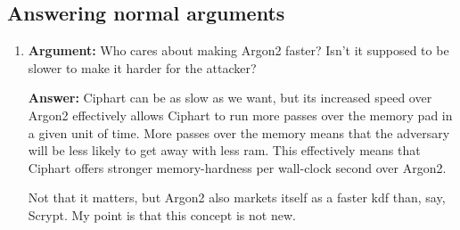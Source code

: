 \documentclass[twocolumn]{article}
\begin{document}
\subsection*{Answering normal arguments}
\begin{enumerate}
    \item \textbf{Argument:} Who cares about making Argon2 faster?  Isn't
    it supposed to be slower to make it harder for the attacker?

    \textbf{Answer:} Ciphart can be as slow as we want, but its increased
    speed over Argon2 effectively allows Ciphart to run more passes over
    the memory pad in a given unit of time.  More passes over the memory
    means that the adversary will be less likely to get away with less
    \gls{ram}.  This effectively means that Ciphart offers stronger
    memory-hardness per wall-clock second over Argon2.

    Not that it matters, but Argon2 also markets itself as a faster
    \gls{kdf} than, say, Scrypt.  My point is that this concept is not new.
\end{enumerate}
\end{document}

